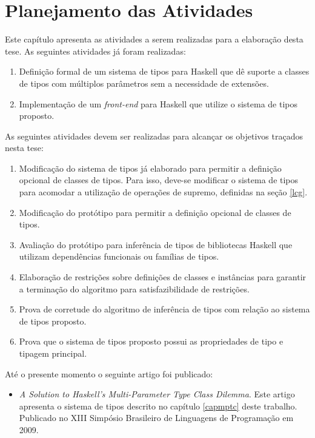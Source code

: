 \chapter{Planejamento das Atividades}\label{plan}

Este cap\'itulo apresenta as atividades a serem realizadas para a elabora\c{c}\~ao desta tese.
As seguintes atividades j\'a foram realizadas:

\begin{enumerate}
	\item Defini\c{c}\~ao formal de um sistema de tipos para Haskell que d\^e suporte a classes de tipos com 
	      m\'ultiplos par\^ametros sem a necessidade de extens\~oes.
	\item Implementa\c{c}\~ao de um \emph{front-end} para Haskell que utilize o sistema de tipos proposto.	 
\end{enumerate}

As seguintes atividades devem ser realizadas para alcan\c{c}ar os objetivos tra\c{c}ados nesta tese:

\begin{enumerate}
	\item Modifica\c{c}\~ao do sistema de tipos j\'a elaborado para permitir a defini\c{c}\~ao opcional de
	      classes de tipos. Para isso, deve-se modificar o sistema de tipos para acomodar a utiliza\c{c}\~ao
	      de opera\c{c}\~oes de supremo, definidas na se\c{c}\~ao \ref{lcg}.
	\item Modifica\c{c}\~ao do prot\'otipo para permitir a defini\c{c}\~ao opcional de classes de tipos.
	\item Avalia\c{c}\~ao do prot\'otipo para infer\^encia de tipos de bibliotecas Haskell que utilizam depend\^encias
	      funcionais ou fam\'ilias de tipos. 
	\item Elabora\c{c}\~ao de restri\c{c}\~oes sobre defini\c{c}\~oes de classes e inst\^ancias para garantir a 
	      termina\c{c}\~ao do algoritmo para satisfazibilidade de restri\c{c}\~oes.
	\item Prova de corretude do algoritmo de infer\^encia de tipos com rela\c{c}\~ao ao sistema de tipos
	      proposto.
	\item Prova que o sistema de tipos proposto possui as propriedades de tipo e tipagem principal.
\end{enumerate}

At\'e o presente momento o seguinte artigo foi publicado:
\begin{itemize}
	\item \emph{A Solution to Haskell's Multi-Parameter Type Class Dilemma}. Este artigo apresenta o sistema de tipos
	      descrito no cap\'itulo \ref{capmptc} deste trabalho. Publicado no XIII Simp\'osio Brasileiro
	      de Linguagens de Programa\c{c}\~ao em 2009.
\end{itemize}


